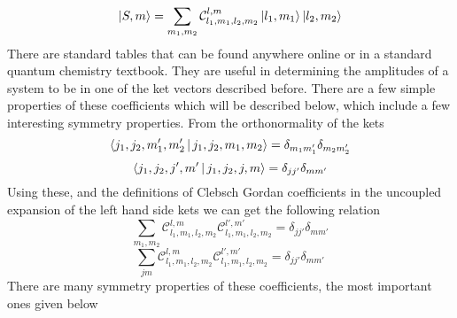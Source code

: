 \documentclass[12pt]{article}
\begin{document}
$$\Ket{S,m} = \sum_{m_1,m_2}\mathcal{C}_{l_1,m_1,l_2,m_2}^{l,m}\Ket{l_1,m_1}\Ket{l_2,m_2}$$ There are standard tables that can be found anywhere online or in a standard quantum chemistry textbook. They are useful in determining the amplitudes of a system to be in one of the ket vectors described before. There are a few simple properties of these coefficients which will be described below, which include a few interesting symmetry properties. From the orthonormality of the kets $$\Braket{j_1,j_2,m'_1,m'_2|j_1,j_2,m_1,m_2} = \delta_{m_1m'_1}\delta_{m_2m'_2}$$
$$\Braket{j_1,j_2,j',m'|j_1,j_2,j,m} = \delta_{jj'}\delta_{mm'}$$ Using these, and the definitions of Clebsch Gordan coefficients in the uncoupled expansion of the left hand side kets we can get the following relation 
$$\sum_{m_1,m_2}\mathcal{C}_{l_1,m_1,l_2,m_2}^{l,m}\mathcal{C}_{l_1,m_1,l_2,m_2}^{l',m'} = \delta_{jj'}\delta_{mm'}$$
$$\sum_{jm}\mathcal{C}_{l_1,m_1,l_2,m_2}^{l,m}\mathcal{C}_{l_1,m_1,l_2,m_2}^{l',m'} = \delta_{jj'}\delta_{mm'}$$
There are many symmetry properties of these coefficients, the most important ones given below
\end{document}
